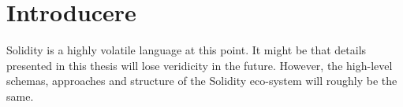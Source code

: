 \chapter*{Introducere} 

Solidity is a highly volatile language at this point. It might be that details presented in this thesis will lose veridicity in the future.
However, the high-level schemas, approaches and structure of the Solidity eco-system will roughly be the same.
